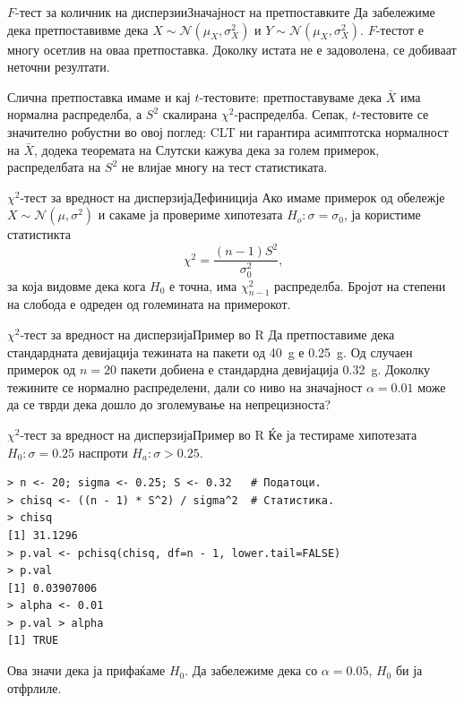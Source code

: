 \documentclass[hyperref={unicode}, xcolor={svgnames, table},
usepdftitle=false]{beamer}
\theoremstyle{remark}
\begin{document}
\begin{frame}[fragile]{\(F\)-тест за количник на дисперзии}{Значајност на
    претпоставките}
  Да забележиме дека претпоставивме дека
  \(X \sim \mathcal{N}(\mu_X, \sigma_X^2)\) и
  \(Y \sim \mathcal{N}(\mu_X, \sigma_X^2)\).  \(F\)-тестот е \alert{многу
    осетлив} на оваа претпоставка.  Доколку истата не е задоволена, се добиваат
  неточни резултати.

  Слична претпоставка имаме и кај \(t\)-тестовите: претпоставуваме дека
  \(\bar{X}\) има нормална распределба, а \(S^2\) скалирана
  \(\chi^2\)-распределба.  Сепак, \(t\)-тестовите се значително робустни во овој
  поглед: CLT ни гарантира асимптотска нормалност на \(\bar{X}\), додека
  теоремата на Слутски кажува дека за голем примерок, распределбата на \(S^2\)
  не влијае многу на тест статистиката.
\end{frame}

\begin{frame}{\(\chi^2\)-тест за вредност на дисперзија}{Дефиниција}
  Ако имаме примерок од обележје \(X \sim \mathcal{N}(\mu, \sigma^2)\) и сакаме
  ја провериме хипотезата \(H_o \colon \sigma = \sigma_0\), ја користиме
  статистикта
  \[
    \chi^2 = \frac{(n - 1) S^2}{\sigma_0^2}\text{,}
  \]
  за која видовме дека кога \(H_0\) е точна, има \(\chi^2_{n - 1}\) распределба.
  Бројот на степени на слобода е одреден од големината на примерокот.
\end{frame}

\begin{frame}[fragile]{\(\chi^2\)-тест за вредност на дисперзија}{Пример во R}
  Да претпоставиме дека стандардната девијација тежината на пакети од
  \SI{40}{\gram} е \SI{0.25}{\gram}.  Од случаен примерок од \(n = 20\) пакети
  добиена е стандардна девијација \SI{0.32}{\gram}.  Доколку тежините се
  нормално распределени, дали со ниво на значајност \(\alpha = \num{0.01}\) може
  да се тврди дека дошло до зголемување на непрецизноста?
\end{frame}

\begin{frame}[fragile]{\(\chi^2\)-тест за вредност на дисперзија}{Пример во R}
  Ќе ја тестираме хипотезата \(H_0 \colon \sigma = 0.25\) наспроти
  \(H_a \colon \sigma > 0.25\).
\begin{verbatim}
> n <- 20; sigma <- 0.25; S <- 0.32   # Податоци.
> chisq <- ((n - 1) * S^2) / sigma^2  # Статистика.
> chisq
[1] 31.1296
> p.val <- pchisq(chisq, df=n - 1, lower.tail=FALSE)
> p.val
[1] 0.03907006
> alpha <- 0.01
> p.val > alpha
[1] TRUE
\end{verbatim}
  Ова значи дека ја прифаќаме \(H_0\).  Да забележиме дека со
  \(\alpha = \num{0.05}\), \(H_0\) би ја отфрлиле.
\end{frame}
\end{document}
